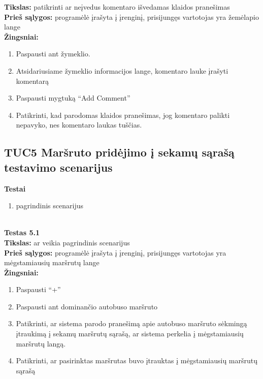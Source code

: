 \documentclass{VUMIFPSkursinis}
\begin{document}
		\textbf{Tikslas:} patikrinti ar neįvedus komentaro išvedamas klaidos pranešimas\\
		\textbf{Prieš sąlygos:} programėlė įrašyta į įrenginį, prisijungęs vartotojas yra žemėlapio lange\\
		\textbf{Žingsniai:}
		\begin{enumerate}[noitemsep,topsep=0pt]
			\item Paspausti ant žymeklio.
			\item Atsidariusiame žymeklio informacijos lange, komentaro lauke įrašyti komentarą
			\item Paspausti mygtuką “Add Comment”
			\item Patikrinti, kad parodomas klaidos pranešimas, jog komentaro palikti nepavyko, nes komentaro laukas tuščias.
		\end{enumerate}

	\subsection{TUC5 Maršruto pridėjimo į sekamų sąrašą testavimo scenarijus}
		\textbf{Testai}
		\begin{enumerate}[noitemsep,topsep=0pt]
			\item pagrindinis scenarijus
		\end{enumerate}
		\textbf{}\\
		\textbf{Testas 5.1}\\
		\textbf{Tikslas:} ar veikia pagrindinis scenarijus\\
		\textbf{Prieš sąlygos:} programėlė įrašyta į įrenginį, prisijungęs vartotojas yra mėgstamiausių maršrutų lange\\
		\textbf{Žingsniai:}
		\begin{enumerate}[noitemsep,topsep=0pt]
			\item Paspausti “+”
			\item Paspausti ant dominančio autobuso maršruto
			\item Patikrinti, ar sistema parodo pranešimą apie autobuso maršruto sėkmingą įtraukimą į sekamų maršrutų sąrašą, ar sistema perkelia į mėgstamiausių maršrutų langą.
			\item Patikrinti, ar pasirinktas maršrutas buvo įtrauktas į mėgstamiausių maršrutų sąrašą
		\end{enumerate}
\end{document}
